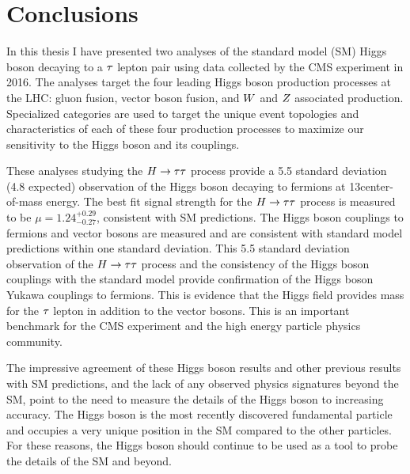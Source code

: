 \chapter{Conclusions}
\label{sec:conclusion}

In this thesis I have presented two analyses of the standard model (SM) Higgs boson decaying 
to a $\tau$ lepton pair using data collected by the CMS experiment in 2016.
The analyses target the four leading Higgs boson production processes at the LHC:
gluon fusion, vector boson fusion, and $W$ and $Z$ associated production.
Specialized categories are used to target the unique event topologies and 
characteristics of each of these four production processes to maximize our
sensitivity to the Higgs boson and its couplings. 

These analyses studying the $H\to\tau\tau$ process provide a 5.5 standard deviation (4.8 expected)
observation of the Higgs boson decaying to fermions at 13\TeV center-of-mass energy. 
The best fit signal strength for the $H\to\tau\tau$ process is measured to be 
$\mu = 1.24 ^{+0.29} _{-0.27}$, consistent with SM predictions.
The Higgs boson couplings to fermions and vector bosons are measured and are 
consistent with standard model predictions within one standard deviation.
This 5.5 standard deviation observation of the $H\to\tau\tau$ process and the consistency
of the Higgs boson couplings with the standard model provide confirmation of the Higgs boson
Yukawa couplings to fermions.
This is evidence that the Higgs field provides mass
for the $\tau$ lepton in addition to the vector bosons.
This is an important benchmark for the CMS experiment and the high energy
particle physics community.

The impressive agreement of these Higgs boson results and other previous results
with SM predictions, and the lack of any observed physics signatures beyond
the SM, point to the need to measure the details of the Higgs boson to increasing
accuracy. The Higgs boson is the most recently discovered fundamental particle and occupies a very
unique position in the SM compared to the other particles. For these reasons,
the Higgs boson should continue to be used as a tool to probe the details of the SM and beyond.




